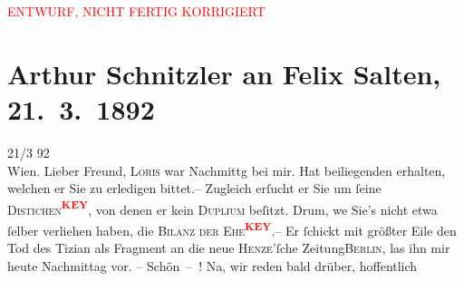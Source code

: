 
\begin{center}
            \textcolor{red}{ENTWURF, NICHT FERTIG KORRIGIERT}
                      \end{center}
            
         
         \newcommand{\erwaehntePersonen}{Personen: Max Henze, Hugo von Hofmannsthal, Felix Salten}
         \newcommand{\erwaehnteInstitutionen}{Institutionen: Allgemeine Theater-Revue für Bühne und Welt. Illustrierte Halbmonatsschrift}
         \newcommand{\erwaehnteOrte}{Orte: Berlin, Café Central, Wien}
         \newcommand{\erwaehnteWerke}{Werke: Der Tod des Tizian}
               \section[Arthur Schnitzler an Felix Salten, 21. 3. 1892]{ Arthur Schnitzler an Felix Salten, 21. 3. 1892}\nopagebreak{}\rehead{ }\begin{ledgroupsized}[t]{13cm}\normalsize\beginnumbering \toendnotes[C]{\smallbreak\pagebreak[2]} 
\toendnotes[C]{\smallbreak}\pstart
           \raggedleft{}{\pb}21/3 92{\\}Wien. \pend
           \pstart{}Lieber Freund,\pend\pstart
           \textsc{Loris} war Nachmittg bei mir. Hat beiliegenden \label{K_L02955-1v}\label{K_L02955-1h} erhalten, welchen er Sie zu erledigen bittet.– Zugleich
               erſucht er Sie um ſeine \textsc{Distichen\textcolor{red}{\textsuperscript{\textbf{KEY}}}}, von denen er kein \textsc{Duplium} beſitzt. Drum, we{\geminationn} Sie’s {\pb}nicht etwa ſelber verliehen haben,
               die \textsc{Bilanz der Ehe\textcolor{red}{\textsuperscript{\textbf{KEY}}}}.– \pend
           \pstart
           Er ſchickt mit größter Eile den Tod des Tizian
               als Fragment an die neue \textsc{Henze}’ſche Zeitung\textsc{Berlin}, las ihn mir heute Nachmittag vor. – Schön – ! Na, wir {\pb}reden bald drüber, hoffentlich

\end{ledgroupsized}

